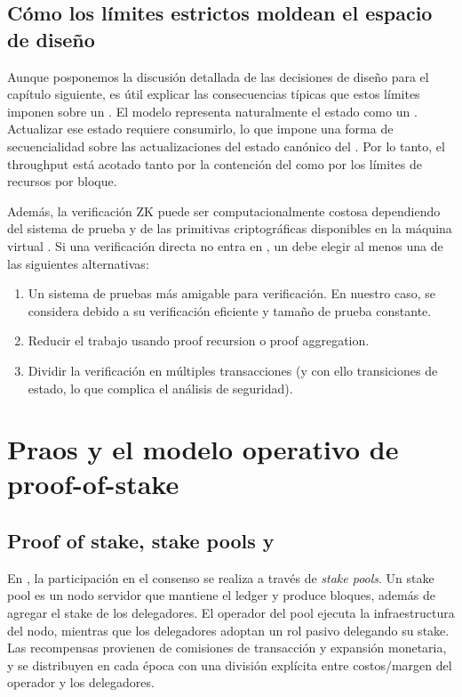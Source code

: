 \subsection{Cómo los límites estrictos moldean el espacio de diseño}

Aunque posponemos la discusión detallada de las decisiones de diseño para el capítulo siguiente, es útil explicar las consecuencias típicas que estos límites imponen sobre un \zkBridge. El modelo \eUTxO representa naturalmente el estado como un \UTxO. Actualizar ese estado requiere consumirlo, lo que impone una forma de secuencialidad sobre las actualizaciones del estado canónico del \Bridge. Por lo tanto, el throughput está acotado tanto por la contención del \UTxO como por los límites de recursos por bloque.

Además, la verificación ZK puede ser computacionalmente costosa dependiendo del sistema de prueba y de las primitivas criptográficas disponibles en la máquina virtual \Onchain. Si una verificación directa no entra en \maxTxExUnits, un \Bridge debe elegir al menos una de las siguientes alternativas:

\begin{enumerate}[noitemsep]
	\item Un sistema de pruebas más amigable para verificación. En nuestro caso, se considera \Groth debido a su verificación eficiente y tamaño de prueba constante.
	\item Reducir el trabajo \Onchain usando proof recursion o proof aggregation.
	\item Dividir la verificación en múltiples transacciones (y con ello transiciones de estado, lo que complica el análisis de seguridad).
\end{enumerate}

\section{Praos y el modelo operativo de proof-of-stake}
\subsection{Proof of stake, stake pools y \SPOs}
En \Cardano, la participación en el consenso se realiza a través de \emph{stake pools}. Un stake pool es un nodo servidor que mantiene el ledger y produce bloques, además de agregar el stake de los delegadores. El operador del pool ejecuta la infraestructura del nodo, mientras que los delegadores adoptan un rol pasivo delegando su stake. Las recompensas provienen de comisiones de transacción y expansión monetaria, y se distribuyen en cada época con una división explícita entre costos/margen del operador y los delegadores.

